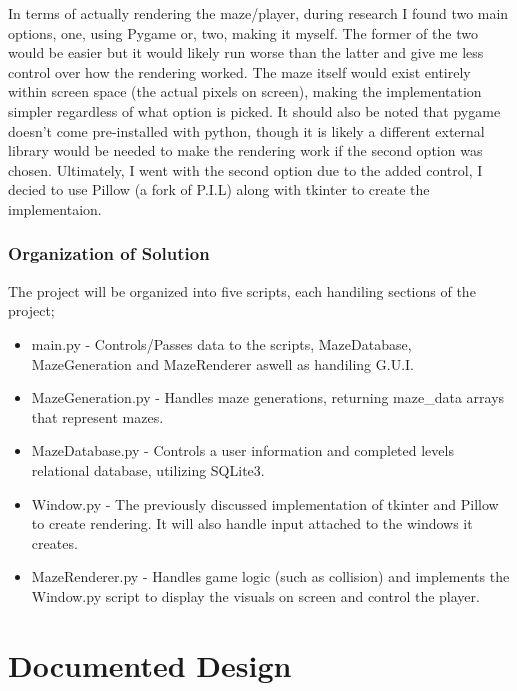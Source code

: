 \documentclass{article}
\begin{document}
In terms of actually rendering the maze/player, during research I found two main options, one, using Pygame or, two, making it myself. The former of the
two would be easier but it would likely run worse than the latter and give me less control over how the rendering worked. The maze itself would exist entirely 
within screen space (the actual pixels on screen), making the implementation simpler regardless of what option is picked. It should also be noted that pygame
doesn't come pre-installed with python, though it is likely a different external library would be needed to make the rendering work if the
second option was chosen.
Ultimately, I went with the second option due to the added control, I decied to use Pillow (a fork of P.I.L) along with tkinter to create the
implementaion.

\section{Organization of Solution}
The project will be organized into five scripts, each handiling sections of the project;
\begin{itemize}
\item main.py - Controls/Passes data to the scripts, MazeDatabase, MazeGeneration and MazeRenderer aswell as handiling G.U.I.
\item MazeGeneration.py - Handles maze generations, returning maze\_data arrays that represent mazes.
\item MazeDatabase.py - Controls a user information and completed levels relational database, utilizing SQLite3.
\item Window.py - The previously discussed implementation of tkinter and Pillow to create rendering. It will also handle input attached to the windows it creates.
\item MazeRenderer.py - Handles game logic (such as collision) and implements the Window.py script to display the visuals on screen and control the player.
\end{itemize}

\clearpage
\part{Documented Design}
\end{document}
